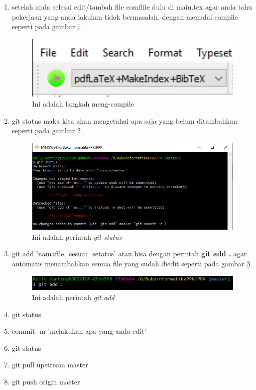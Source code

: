 \begin{enumerate}
\begin{figure}[!htbp]
		\end{figure}
\item setelah anda selesai edit/tambah file comflile dulu di main.tex agar anda tahu pekerjaan yang anda lakukan tidak bermasalah. dengan memulai compile seperti pada gambar \ref{fig:p4}
		\begin{figure}[!htbp]
		\centering
		\includegraphics[width=1\textwidth]{figures/pullrequest/p4.PNG}
		\caption{Ini adalah langkah meng-compile}
		\label{fig:p4}
		\end{figure}
\item git status maka kita akan mengetahui apa saja yang belum ditambahkan seperti pada gambar \ref{fig:p5}
		\begin{figure}[!htbp]
		\centering
		\includegraphics[width=1\textwidth]{figures/pullrequest/p5.PNG}
		\caption{Ini adalah perintah \textit{git status}}
		\label{fig:p5}
		\end{figure}
\item git add 'namafile\_sesuai\_setatus' atau bisa dengan perintah \textbf{git add .} agar automatis menambahkan semua file yang sudah diedit seperti pada gambar \ref{fig:p6}
		\begin{figure}[!htbp]
		\centering
		\includegraphics[width=1\textwidth]{figures/pullrequest/p6.PNG}
		\caption{Ini adalah perintah \textit{git add}}
		\label{fig:p6}
		\end{figure}
\item git status 
\item commit -m 'melakukan apa yang anda edit'
\item git status
\item git pull upstream master
\item git push origin master
\end{enumerate}

